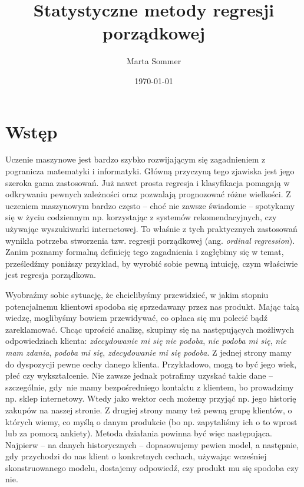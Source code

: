 \documentclass{mini}
\title{Statystyczne metody regresji porządkowej}
\author{Marta Sommer}
\date{\today}
\begin{document}
\maketitle
\tableofcontents

\chapter*{Wstęp}

Uczenie maszynowe jest bardzo szybko rozwijającym się zagadnieniem z pogranicza matematyki i informatyki. Główną przyczyną tego zjawiska jest jego szeroka gama zastosowań. Już nawet prosta regresja i klasyfikacja pomagają w odkrywaniu pewnych zależności oraz pozwalają prognozować różne wielkości. Z uczeniem maszynowym bardzo często -- choć nie zawsze świadomie -- spotykamy się w życiu codziennym np. korzystając z systemów rekomendacyjnych, czy używając wyszukiwarki internetowej. To właśnie z tych praktycznych zastosowań wynikła potrzeba stworzenia tzw. regresji porządkowej (ang. \textit{ordinal regression}). Zanim poznamy formalną definicję tego zagadnienia i zagłębimy się w temat, prześledźmy poniższy przykład, by wyrobić sobie pewną intuicję, czym właściwie jest regresja porządkowa.  

Wyobraźmy sobie sytuację, że chcielibyśmy przewidzieć, w jakim stopniu potencjalnemu klientowi spodoba się sprzedawany przez nas produkt. Mając taką wiedzę, moglibyśmy bowiem przewidywać, co opłaca się mu polecić bądź zareklamować. Chcąc uprościć analizę, skupimy się na następujących możliwych odpowiedziach klienta: \textit{zdecydowanie mi się nie podoba}, \textit{nie podoba mi się}, \textit{nie mam zdania}, \textit{podoba mi się}, \textit{zdecydowanie mi się podoba}. Z jednej strony mamy do dyspozycji pewne cechy danego klienta. Przykładowo, mogą to być jego wiek, płeć czy wykształcenie. Nie zawsze jednak potrafimy uzyskać takie dane -- szczególnie, gdy~nie mamy bezpośredniego kontaktu z klientem, bo prowadzimy np. sklep internetowy. Wtedy jako wektor cech możemy przyjąć np. jego historię zakupów na naszej stronie. Z drugiej strony mamy też pewną grupę klientów, o których wiemy, co myślą o danym produkcie (bo np. zapytaliśmy ich o to wprost lub za pomocą ankiety). Metoda działania powinna być więc następująca. Najpierw -- na danych historycznych -- dopasowujemy pewien model, a następnie, gdy przychodzi do nas klient o konkretnych cechach, używając wcześniej skonstruowanego modelu, dostajemy odpowiedź, czy produkt mu się spodoba czy nie. 
\end{document}
